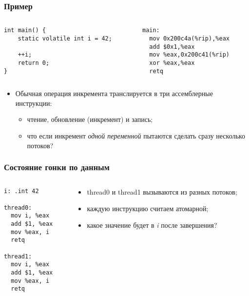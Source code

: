 \begin{frame}[fragile]
\frametitle{Пример}
\begin{columns}
  \begin{column}{.45\linewidth}
    \begin{lstlisting}
int main() {
    static volatile int i = 42;

    ++i;
    return 0;
}
    \end{lstlisting}
  \end{column}
  \begin{column}{.45\linewidth}
    \begin{lstlisting}
main:
  mov 0x200c4a(%rip),%eax
  add $0x1,%eax
  mov %eax,0x200c41(%rip)
  xor %eax,%eax
  retq
    \end{lstlisting}
  \end{column}
\end{columns}
\begin{itemize}
  \item Обычная операция инкремента транслируется в три ассемблерные инструкции:
  \begin{itemize}
    \item чтение, обновление (инкремент) и запись;
    \item что если инкремент \emph{одной переменной} пытаются сделать сразу
    несколько потоков?
  \end{itemize}
\end{itemize}
\end{frame}

\begin{frame}[fragile]
\frametitle{Состояние гонки по данным}
\begin{columns}
  \begin{column}{.3\linewidth}
    \begin{lstlisting}
i: .int 42

thread0:
  mov i, %eax
  add $1, %eax
  mov %eax, i
  retq

thread1:
  mov i, %eax
  add $1, %eax
  mov %eax, i
  retq
    \end{lstlisting}
  \end{column}
  \begin{column}{.7\linewidth}
    \begin{itemize}
      \item thread0 и thread1 вызываются из разных потоков;
      \item каждую инструкцию считаем атомарной;
      \item какое значение будет в \emph{i} после завершения?
    \end{itemize}
  \end{column}
\end{columns}
\end{frame}

